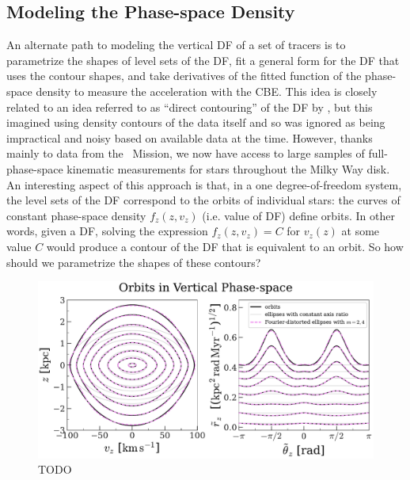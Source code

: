 \subsection{Modeling the Phase-space Density} \label{sec:psd}

An alternate path to modeling the vertical DF of a set of tracers is to parametrize the
shapes of level sets of the DF, fit a general form for the DF that uses the contour
shapes, and take derivatives of the fitted function of the phase-space density to
measure the acceleration with the CBE.
This idea is closely related to an idea referred to as ``direct contouring'' of the DF
by \citet{Kuijken:XXXX}, but this imagined using density contours of the data itself and
so was ignored as being impractical and noisy based on available data at the time.
However, thanks mainly to data from the \gaia\ Mission, we now have access to large
samples of full-phase-space kinematic measurements for stars throughout the Milky Way
disk.
An interesting aspect of this approach is that, in a one degree-of-freedom system, the
level sets of the DF correspond to the orbits of individual stars:
the curves of constant phase-space density $f_z(z, v_z)$ (i.e. value of DF) define
orbits.
In other words, given a DF, solving the expression $f_z(z, v_z) = C$ for $v_z(z)$ at
some value $C$ would produce a contour of the DF that is equivalent to an orbit.
So how should we parametrize the shapes of these contours?

\begin{figure}[t!]
\begin{center}
\includegraphics[width=\textwidth]{simulated-orbits-fourier.pdf}
\end{center}
\caption{%
TODO
\label{fig:fourier-contours}
}
\end{figure}

